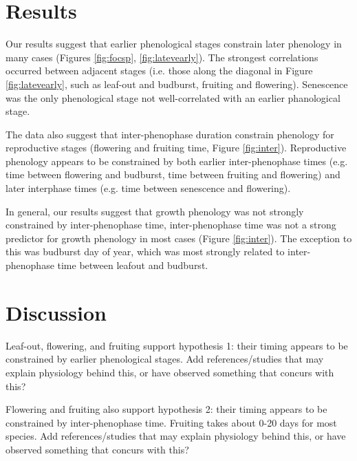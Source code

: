 \documentclass{article}
\begin{document}
\section* {Results}

\par Our results suggest that earlier phenological stages constrain later phenology in many cases (Figures \ref{fig:focsp}, \ref{fig:latevearly}). The strongest correlations occurred between adjacent stages (i.e. those along the diagonal in Figure \ref{fig:latevearly}, such as leaf-out and budburst, fruiting and flowering). Senescence was the only phenological stage not well-correlated with an earlier phanological stage.
\par The data also suggest that inter-phenophase duration constrain phenology for reproductive stages (flowering and fruiting time, Figure \ref{fig:inter}). Reproductive phenology appears to be constrained by both earlier inter-phenophase times (e.g. time between flowering and budburst, time between fruiting and flowering) and later interphase times (e.g. time between senescence and flowering). 

\par In general, our results suggest that growth phenology was not strongly constrained by inter-phenophase time, inter-phenophase time was not a strong predictor for growth phenology in most cases (Figure \ref{fig:inter}). The exception to this was budburst day of year, which was most strongly related to inter-phenophase time between leafout and budburst.

\section* {Discussion}
Leaf-out, flowering, and fruiting support hypothesis 1: their timing appears to be constrained by earlier phenological stages.  
Add references/studies that may explain physiology behind this, or have observed something that concurs with this?
\par Flowering and fruiting also support hypothesis 2: their timing appears to be constrained by inter-phenophase time. Fruiting takes about 0-20 days for most species. Add references/studies that may explain physiology behind this, or have observed something that concurs with this?
\end{document}
